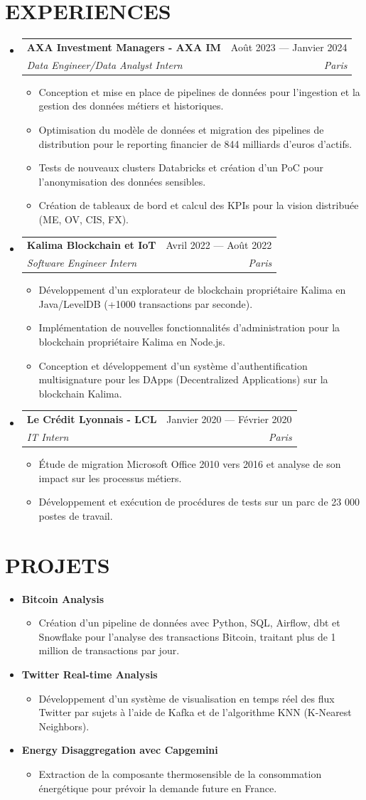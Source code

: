 \documentclass[11pt,a4paper]{article}
\makeatletter
\newcommand{\resumeItem}[1]{
  \item\footnotesize{
    {#1 \vspace{-1pt}}
  }
}
\newcommand{\resumeSubheading}[4]{
  \vspace{2pt}\item
    \begin{tabular*}{\textwidth}[t]{l@{\extracolsep{\fill}}r}
      {\footnotesize\textbf{#1}} & {\footnotesize#2} \\
      {\footnotesize\textit{#3}} & {\footnotesize\textit{#4}} \\
    \end{tabular*}\vspace{2pt}
}
\newcommand{\resumeProjectHeading}[2]{
  \item
  {\footnotesize#1} \hfill {#2}
}
\newcommand{\resumeSubHeadingListStart}{\begin{itemize}[leftmargin=0in, label={}]}
\newcommand{\resumeSubHeadingListEnd}{\end{itemize}}
\newcommand{\resumeItemListStart}{\begin{itemize}[label={\textbullet}]}
\newcommand{\resumeItemListEnd}{\end{itemize}\vspace{0pt}}
\makeatother
\begin{document}
\section{EXPERIENCES}
\resumeSubHeadingListStart
    \resumeSubheading
      {AXA Investment Managers - AXA IM}{Août 2023 --- Janvier 2024}
      {Data Engineer/Data Analyst Intern}{Paris}
      \resumeItemListStart
        \resumeItem{Conception et mise en place de pipelines de données pour l'ingestion et la gestion des données métiers et historiques.}
        \resumeItem{Optimisation du modèle de données et migration des pipelines de distribution pour le reporting financier de 844 milliards d'euros d'actifs.}
        \resumeItem{Tests de nouveaux clusters Databricks et création d'un PoC pour l'anonymisation des données sensibles.}
        \resumeItem{Création de tableaux de bord et calcul des KPIs pour la vision distribuée (ME, OV, CIS, FX).}
      \resumeItemListEnd
    \resumeSubheading
      {Kalima Blockchain et IoT}{Avril 2022 --- Août 2022}
      {Software Engineer Intern}{Paris}
      \resumeItemListStart
        \resumeItem{Développement d'un explorateur de blockchain propriétaire Kalima en Java/LevelDB (+1000 transactions par seconde).}
        \resumeItem{Implémentation de nouvelles fonctionnalités d'administration pour la blockchain propriétaire Kalima en Node.js.}
        \resumeItem{Conception et développement d'un système d'authentification multisignature pour les DApps (Decentralized Applications) sur la blockchain Kalima.}
      \resumeItemListEnd
    \resumeSubheading
      {Le Crédit Lyonnais - LCL}{Janvier 2020 --- Février 2020}
      {IT Intern}{Paris}
      \resumeItemListStart
        \resumeItem{Étude de migration Microsoft Office 2010 vers 2016 et analyse de son impact sur les processus métiers.}
        \resumeItem{Développement et exécution de procédures de tests sur un parc de 23 000 postes de travail.}
      \resumeItemListEnd
  \resumeSubHeadingListEnd

\section{PROJETS}
\resumeSubHeadingListStart
    \resumeProjectHeading
      {\textbf{Bitcoin Analysis}} {}
      \resumeItemListStart
        \resumeItem{Création d'un pipeline de données avec Python, SQL, Airflow, dbt et Snowflake pour l'analyse des transactions Bitcoin, traitant plus de 1 million de transactions par jour.}
      \resumeItemListEnd
    \resumeProjectHeading
      {\textbf{Twitter Real-time Analysis}} {}
      \resumeItemListStart
        \resumeItem{Développement d'un système de visualisation en temps réel des flux Twitter par sujets à l'aide de Kafka et de l'algorithme KNN (K-Nearest Neighbors).}
      \resumeItemListEnd
    \resumeProjectHeading
      {\textbf{Energy Disaggregation avec Capgemini}} {}
      \resumeItemListStart
        \resumeItem{Extraction de la composante thermosensible de la consommation énergétique pour prévoir la demande future en France.}
      \resumeItemListEnd
\resumeSubHeadingListEnd
\end{document}
